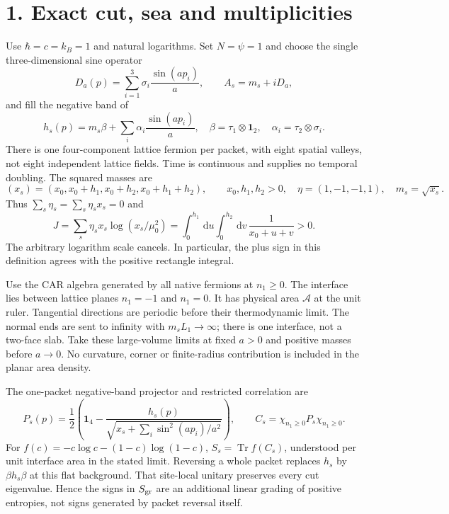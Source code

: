 \documentclass[10pt]{article}
\newcommand{\Tr}{\operatorname{Tr}}
\newcommand{\id}{\mathbf 1}
\newcommand{\dd}{\,\mathrm d}
\begin{document}
\section*{1. Exact cut, sea and multiplicities}
Use $\hbar=c=k_B=1$ and natural logarithms. Set $N=\psi=1$
and choose the single three-dimensional sine operator
\[
 D_a(p)=\sum_{i=1}^3\sigma_i\frac{\sin(ap_i)}a,
 \qquad A_s=m_s+iD_a,
\]
and fill the negative band of
\begin{equation}
 h_s(p)=m_s\beta+\sum_i\alpha_i\frac{\sin(ap_i)}a,
 \quad \beta=\tau_1\otimes\id_2,\quad
 \alpha_i=\tau_2\otimes\sigma_i.
 \label{eq:s-flat-h}
\end{equation}
There is one four-component lattice fermion per packet, with eight
spatial valleys, not eight independent lattice fields. Time is
continuous and supplies no temporal doubling. The squared masses are
\[
 (x_s)=(x_0,x_0+h_1,x_0+h_2,x_0+h_1+h_2),\qquad
 x_0,h_1,h_2>0,
 \quad\eta=(1,-1,-1,1),\quad m_s=\sqrt{x_s}.
\]
Thus $\sum_s\eta_s=\sum_s\eta_sx_s=0$ and
\begin{equation}
 J=\sum_s\eta_sx_s\log(x_s/\mu_0^2)
   =\int_0^{h_1}\!\dd u\int_0^{h_2}\!\dd v\,
       \frac1{x_0+u+v}>0 .
 \label{eq:s-J}
\end{equation}
The arbitrary logarithm scale cancels. In particular, the plus sign
in this definition agrees with the positive rectangle integral.

Use the CAR algebra generated by all native fermions at
$n_1\ge0$. The interface lies between lattice planes $n_1=-1$ and
$n_1=0$. It has physical area $\mathcal A$ at the unit ruler.
Tangential directions are periodic before their thermodynamic limit.
The normal ends are sent to infinity with $m_s L_1\to\infty$;
there is one interface, not a two-face slab. Take these large-volume
limits at fixed $a>0$ and positive masses before $a\to0$.
No curvature, corner or finite-radius contribution is included in the
planar area density.

The one-packet negative-band projector and restricted correlation are
\[
 P_s(p)=\frac12\left(\id_4-
       \frac{h_s(p)}{\sqrt{x_s+\sum_i\sin^2(ap_i)/a^2}}\right),
 \qquad C_s=\chi_{n_1\ge0}P_s\chi_{n_1\ge0}.
\]
For $f(c)=-c\log c-(1-c)\log(1-c)$,
$S_s=\Tr f(C_s)$, understood per unit interface area in the stated
limit. Reversing a whole packet replaces $h_s$ by
$\beta h_s\beta$ at this flat background. That site-local unitary
preserves every cut eigenvalue. Hence the signs in $S_{\rm gr}$ are
an additional linear grading of positive entropies, not signs
generated by packet reversal itself.
\end{document}
